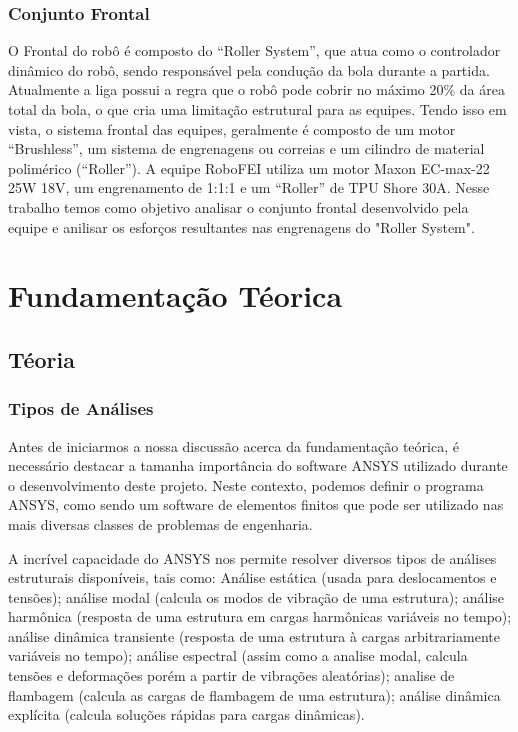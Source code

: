 \documentclass[deposito, acronym, symbols]{fei}
\begin{document}
\subsection{Conjunto Frontal}

O Frontal do robô é composto do “Roller System”, que atua como o controlador dinâmico do robô, sendo responsável pela condução da bola durante a partida. Atualmente a liga possui a regra que o robô pode cobrir no máximo 20\% da área total da bola, o que cria uma limitação estrutural para as equipes. Tendo isso em vista, o sistema frontal das equipes, geralmente é composto de um motor “Brushless”, um sistema de engrenagens ou correias e um cilindro de material polimérico (“Roller”). A equipe RoboFEI utiliza um motor Maxon EC-max-22 25W 18V, um engrenamento de 1:1:1 e um “Roller” de TPU Shore 30A. Nesse trabalho temos como objetivo analisar o conjunto frontal desenvolvido pela equipe e anilisar os esforços resultantes nas engrenagens do "Roller System".


\chapter{Fundamentação Téorica}

\section{Téoria}

\subsection{Tipos de Análises}
Antes de iniciarmos a nossa discussão acerca da fundamentação teórica, é necessário destacar a tamanha importância do software ANSYS utilizado durante o desenvolvimento deste projeto. Neste contexto, podemos definir o programa ANSYS, como sendo um software de elementos finitos que pode ser utilizado nas mais diversas classes de problemas de engenharia.

A incrível capacidade do ANSYS nos permite resolver diversos tipos de análises estruturais disponíveis, tais como: Análise estática (usada para deslocamentos e tensões); análise modal (calcula os modos de vibração de uma estrutura); análise harmônica (resposta de uma estrutura em cargas harmônicas variáveis no tempo); análise dinâmica transiente (resposta de uma estrutura à cargas arbitrariamente variáveis no tempo); análise espectral (assim como a analise modal, calcula tensões e deformações porém a partir de vibrações aleatórias); analise de flambagem (calcula as cargas de flambagem de uma estrutura); análise dinâmica explícita (calcula soluções rápidas para cargas dinâmicas). 
\end{document}
